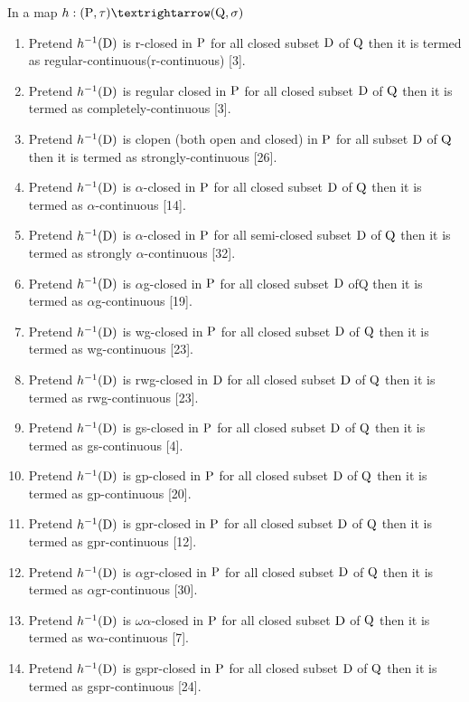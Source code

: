 \begin{dfn}\label{dfn1.3.1}
In a map $h: (\TSP, \tau) →(\TSQ, \sigma)$
\begin{enumerate}
\item Pretend $h^{-1}(\mathrm{D})$ is r-closed in $\mathrm{P}$ for all closed subset $\mathrm{D}$ of $\mathrm{Q}$ then it is termed as regular-continuous(r-continuous) [3]. 
\item Pretend $h^{-1}(\mathrm{D})$ is regular closed in $\mathrm{P}$ for all closed subset $\mathrm{D}$ of $\mathrm{Q}$ then it is termed as completely-continuous [3]. 
\item Pretend $h^{-1}(\mathrm{D})$ is clopen (both open and closed) in $\mathrm{P}$ for all subset $\mathrm{D}$ of $\mathrm{Q}$ then it is termed as strongly-continuous [26]. 
\item Pretend $h^{-1}(\mathrm{D})$ is $\alpha$-closed in $\mathrm{P}$ for all closed subset $\mathrm{D}$ of $\mathrm{Q}$ then it is termed as $\alpha$-continuous [14]. 
\item Pretend $h^{-1}(\mathrm{D})$ is $\alpha$-closed in $\mathrm{P}$ for all semi-closed subset $\mathrm{D}$ of $\mathrm{Q}$ then it is termed as strongly $\alpha$-continuous [32]. 
\item Pretend $h^{-1}(\mathrm{D})$ is $\alpha$g-closed in $\mathrm{P}$ for all closed subset $\mathrm{D}$ ofQ then it is termed as $\alpha$g-continuous [19]. 
\item Pretend $h^{-1}(\mathrm{D})$ is wg-closed in $\mathrm{P}$ for all closed subset $\mathrm{D}$ of $\mathrm{Q}$ then it is termed as wg-continuous [23]. 
\item Pretend $h^{-1}(\mathrm{D})$ is rwg-closed in $\mathrm{D}$ for all closed subset $\mathrm{D}$ of $\mathrm{Q}$ then it is termed as rwg-continuous [23]. 
\item Pretend $h^{-1}(\mathrm{D})$ is gs-closed in $\mathrm{P}$ for all closed subset $\mathrm{D}$ of $\mathrm{Q}$ then it is termed as gs-continuous [4]. 
\item  Pretend $h^{-1}(\mathrm{D})$ is gp-closed in $\mathrm{P}$ for all closed subset $\mathrm{D}$ of $\mathrm{Q}$ then it is termed as gp-continuous [20]. 
\item  Pretend $h^{-1}(\mathrm{D})$ is gpr-closed in $\mathrm{P}$ for all closed subset $\mathrm{D}$ of $\mathrm{Q}$ then it is termed as gpr-continuous [12]. 
\item  Pretend $h^{-1}(\mathrm{D})$ is $\alpha$gr-closed in $\mathrm{P}$ for all closed subset $\mathrm{D}$ of $\mathrm{Q}$ then it is termed as $\alpha$gr-continuous [30]. 
\item  Pretend $h^{-1}(\mathrm{D})$ is $\omega\alpha$-closed in $\mathrm{P}$ for all closed subset $\mathrm{D}$ of $\mathrm{Q}$ then it is termed as w$\alpha$-continuous [7]. 
\item  Pretend $h^{-1}(\mathrm{D})$ is gspr-closed in $\mathrm{P}$ for all closed subset $\mathrm{D}$ of $\mathrm{Q}$ then it is termed as gspr-continuous [24]. 

\end{enumerate}
\end{dfn}
